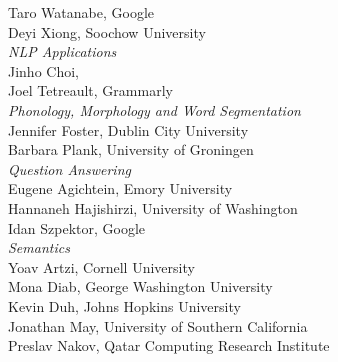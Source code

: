                                     \hspace*{0.2in} Taro Watanabe, Google \\
                                    \hspace*{0.2in} Deyi Xiong, Soochow University \\
                            \emph{NLP Applications} \\
                                    \hspace*{0.2in} Jinho Choi,  \\
                                    \hspace*{0.2in} Joel Tetreault, Grammarly \\
                            \emph{Phonology, Morphology and Word Segmentation} \\
                                    \hspace*{0.2in} Jennifer Foster, Dublin City University \\
                                    \hspace*{0.2in} Barbara Plank, University of Groningen \\
                            \emph{Question Answering} \\
                                    \hspace*{0.2in} Eugene Agichtein, Emory University \\
                                    \hspace*{0.2in} Hannaneh Hajishirzi, University of Washington \\
                                    \hspace*{0.2in} Idan Szpektor, Google \\
                            \emph{Semantics} \\
                                    \hspace*{0.2in} Yoav Artzi, Cornell University \\
                                    \hspace*{0.2in} Mona Diab, George Washington University \\
                                    \hspace*{0.2in} Kevin Duh, Johns Hopkins University \\
                                    \hspace*{0.2in} Jonathan May, University of Southern California \\
                                    \hspace*{0.2in} Preslav Nakov, Qatar Computing Research Institute \\
